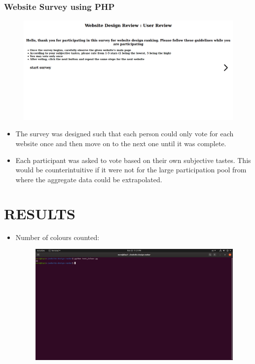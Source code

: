 \documentclass{fisatproject}
\begin{document}
	\subsection{Website Survey using PHP}
	\begin{figure}[h]
		\includegraphics[scale=.25]{surveyrank.png}
	\end{figure}
	\begin{itemize}
		\item The survey was designed such that each person could only vote for each website once and then move on to the next one until it was complete.
		\item Each participant was asked to vote based on their own subjective tastes. This would be counterintuitive if it were not for the large participation pool from where the aggregate data could be extrapolated.
	\end{itemize}
	\chapter{RESULTS}
	\begin{itemize}
		\item Number of colours counted:
	\begin{figure}[h]
		\includegraphics[scale=.3]{colourtest.png}
	\end{figure}
	\end{itemize}
\end{document}
